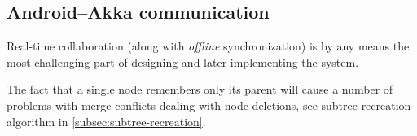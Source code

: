 %
%
%
%
%

\subsection{Android--Akka communication}
\label{subsec:android-akka-comm}

Real-time collaboration (along with \emph{offline} synchronization) is by any means the most challenging part of designing and later implementing the system.


The fact that a single node remembers only its parent will cause a number of problems with merge conflicts dealing with node deletions, see subtree recreation algorithm in \cref{subsec:subtree-recreation}.
